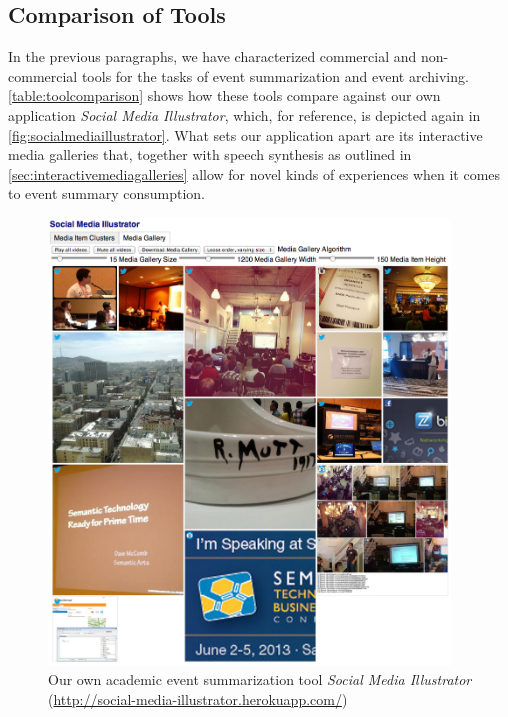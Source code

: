 \subsection{Comparison of Tools}

In the previous paragraphs, we have characterized
commercial and non-commercial tools for the tasks
of event summarization and event archiving. 
\autoref{table:toolcomparison} shows how these tools
compare against our own application \emph{Social Media Illustrator},
which, for reference, is depicted again in \autoref{fig:socialmediaillustrator}.
What sets our application apart
are its interactive media galleries that,
together with speech synthesis as outlined in \autoref{sec:interactivemediagalleries}
allow for novel kinds of experiences when it comes to 
event summary consumption.

\begin{figure}
  \centering
  \includegraphics[width=0.95\textwidth,height=0.9\textheight,keepaspectratio]{socialmediaillustrator.png}
  \caption[Our own academic event summarization tool \emph{Social Media Illustrator}]{Our own academic event summarization tool \emph{Social Media Illustrator} (\url{http://social-media-illustrator.herokuapp.com/})}
  \label{fig:socialmediaillustrator}
\end{figure}

